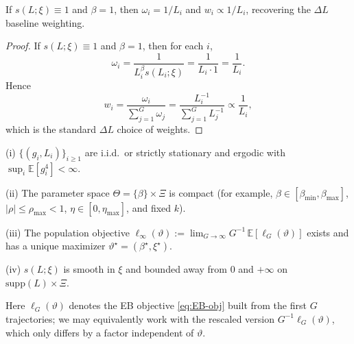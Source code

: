 \begin{proposition}
\label{prop:deltaL}
If \(s(L;\xi)\equiv 1\) and \(\beta=1\), then \(\omega_i=1/L_i\) and \(w_i \propto 1/L_i\), recovering the \(\Delta L\) baseline weighting.
\end{proposition}
\begin{proof}
If \(s(L;\xi)\equiv 1\) and \(\beta=1\), then for each \(i\),
\[
\omega_i
=\frac{1}{L_i^{\beta}s(L_i;\xi)}
=\frac{1}{L_i\cdot 1}
=\frac{1}{L_i}.
\]
Hence
\[
w_i
=\frac{\omega_i}{\sum_{j=1}^G \omega_j}
=\frac{L_i^{-1}}{\sum_{j=1}^G L_j^{-1}}
\propto \frac{1}{L_i},
\]
which is the standard \(\Delta L\) choice of weights.
\end{proof}

\begin{assumption}
\label{assump:reg}
(i) \(\{(g_i,L_i)\}_{i\ge 1}\) are i.i.d.\ or strictly stationary and ergodic with \(\sup_i \mathbb E[g_i^4]<\infty\).

(ii) The parameter space \(\Theta=\{\beta\}\times\Xi\) is compact (for example, \(\beta\in[\beta_{\min},\beta_{\max}]\), \(|\rho|\le \rho_{\max}<1\), \(\eta\in[0,\eta_{\max}]\), and fixed \(k\)).

(iii) The population objective \(\ell_\infty(\vartheta):=\lim_{G\to\infty}G^{-1}\,\mathbb E[\ell_G(\vartheta)]\) exists and has a unique maximizer \(\vartheta^\star=(\beta^\star,\xi^\star)\).

(iv) \(s(L;\xi)\) is smooth in \(\xi\) and bounded away from \(0\) and \(+\infty\) on \(\mathrm{supp}(L)\times\Xi\).
\end{assumption}

Here \(\ell_G(\vartheta)\) denotes the EB objective \eqref{eq:EB-obj} built from the first \(G\) trajectories; we may equivalently work with the rescaled version \(G^{-1}\ell_G(\vartheta)\), which only differs by a factor independent of \(\vartheta\).

